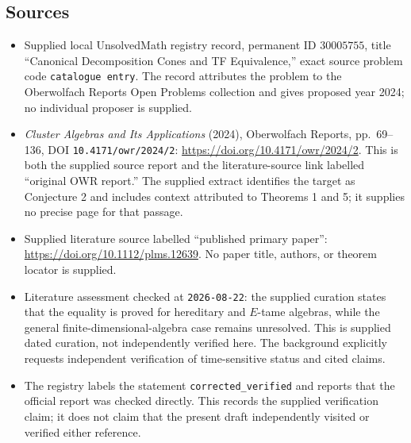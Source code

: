 \documentclass[11pt]{article}
\begin{document}
\subsection{Sources}
\begin{itemize}
\item Supplied local UnsolvedMath registry record, permanent ID \(30005755\), title ``Canonical Decomposition Cones and TF Equivalence,'' exact source problem code \texttt{catalogue entry}. The record attributes the problem to the Oberwolfach Reports Open Problems collection and gives proposed year 2024; no individual proposer is supplied.
\item \emph{Cluster Algebras and Its Applications} (2024), Oberwolfach Reports, pp.\ 69--136, DOI \texttt{10.4171/owr/2024/2}: \url{https://doi.org/10.4171/owr/2024/2}. This is both the supplied source report and the literature-source link labelled ``original OWR report.'' The supplied extract identifies the target as Conjecture 2 and includes context attributed to Theorems 1 and 5; it supplies no precise page for that passage.
\item Supplied literature source labelled ``published primary paper'': \url{https://doi.org/10.1112/plms.12639}. No paper title, authors, or theorem locator is supplied.
\item Literature assessment checked at \texttt{2026-08-22}: the supplied curation states that the equality is proved for hereditary and \(E\)-tame algebras, while the general finite-dimensional-algebra case remains unresolved. This is supplied dated curation, not independently verified here. The background explicitly requests independent verification of time-sensitive status and cited claims.
\item The registry labels the statement \texttt{corrected\_verified} and reports that the official report was checked directly. This records the supplied verification claim; it does not claim that the present draft independently visited or verified either reference.
\end{itemize}
\end{document}
